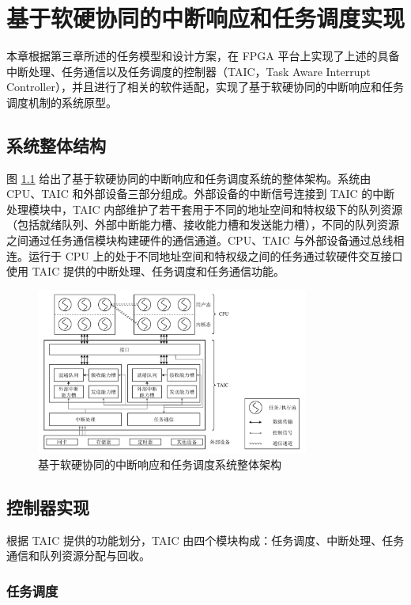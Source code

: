 \chapter{基于软硬协同的中断响应和任务调度实现}

本章根据第三章所述的任务模型和设计方案，在 FPGA 平台上实现了上述的具备中断处理、任务通信以及任务调度的控制器（TAIC，Task Aware Interrupt Controller），并且进行了相关的软件适配，实现了基于软硬协同的中断响应和任务调度机制的系统原型。

\section{系统整体结构}

图 \ref{figure:arch} 给出了基于软硬协同的中断响应和任务调度系统的整体架构。系统由 CPU、TAIC 和外部设备三部分组成。外部设备的中断信号连接到 TAIC 的中断处理模块中，TAIC 内部维护了若干套用于不同的地址空间和特权级下的队列资源（包括就绪队列、外部中断能力槽、接收能力槽和发送能力槽），不同的队列资源之间通过任务通信模块构建硬件的通信通道。CPU、TAIC 与外部设备通过总线相连。运行于 CPU 上的处于不同地址空间和特权级之间的任务通过软硬件交互接口使用 TAIC 提供的中断处理、任务调度和任务通信功能。

\begin{figure}[htbp]
  \centering
  \includegraphics[width=0.8\textwidth]{figures/pdfs/arch.pdf}
  \caption{基于软硬协同的中断响应和任务调度系统整体架构}
  \label{figure:arch}
\end{figure}

\section{控制器实现}

根据 TAIC 提供的功能划分，TAIC 由四个模块构成：任务调度、中断处理、任务通信和队列资源分配与回收。

\subsection{任务调度}

